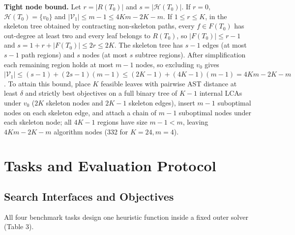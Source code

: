 \documentclass{article}
\begin{document}
\textbf{Tight node bound.} Let \(r=|R(T_0)|\) and \(s=|\mathcal H(T_0)|\). If \(r=0\), \(\mathcal H(T_0)=\{v_0\}\) and \(|\mathcal V_1|\leq m-1\leq 4Km-2K-m\). If \(1\leq r\leq K\), in the skeleton tree obtained by contracting non-skeleton paths, every \(f\in F(T_0)\) has out-degree at least two and every leaf belongs to \(R(T_0)\), so \(|F(T_0)|\leq r-1\) and \(s=1+r+|F(T_0)|\leq 2r\leq 2K\). The skeleton tree has \(s-1\) edges (at most \(s-1\) path regions) and \(s\) nodes (at most \(s\) subtree regions). After simplification each remaining region holds at most \(m-1\) nodes, so excluding \(v_0\) gives \(|\mathcal V_1|\leq(s-1)+(2s-1)(m-1)\leq(2K-1)+(4K-1)(m-1)=4Km-2K-m\). To attain this bound, place \(K\) feasible leaves with pairwise AST distance at least \(\delta\) and strictly best objectives on a full binary tree of \(K-1\) internal LCAs under \(v_0\) (\(2K\) skeleton nodes and \(2K-1\) skeleton edges), insert \(m-1\) suboptimal nodes on each skeleton edge, and attach a chain of \(m-1\) suboptimal nodes under each skeleton node; all \(4K-1\) regions have size \(m-1<m\), leaving \(4Km-2K-m\) algorithm nodes (332 for \(K=24,m=4\)).

\section{Tasks and Evaluation Protocol}\label{tasks-and-evaluation-protocol}

\subsection{Search Interfaces and Objectives}\label{search-interfaces-and-objectives}

All four benchmark tasks design one heuristic function inside a fixed outer solver (Table 3).
\end{document}
